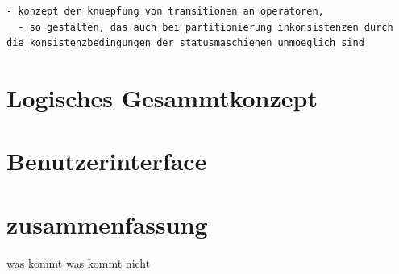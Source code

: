 \begin{verbatim}
- konzept der knuepfung von transitionen an operatoren,
  - so gestalten, das auch bei partitionierung inkonsistenzen durch die konsistenzbedingungen der statusmaschienen unmoeglich sind

\end{verbatim}



\section{Logisches Gesammtkonzept}



\section{Benutzerinterface}



\section{zusammenfassung}

was kommt
was kommt nicht
